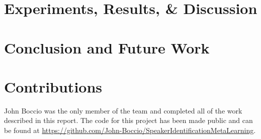 \documentclass{article}
\begin{document}
\section{Experiments, Results, \& Discussion}

\section{Conclusion and Future Work}

\section{Contributions}
John Boccio was the only member of the team and completed all of the work described in this report. The code for this 
project has been made public and can be found at 
\href{https://github.com/John-Boccio/SpeakerIdentificationMetaLearning}{https://github.com/John-Boccio/SpeakerIdentificationMetaLearning}.
\end{document}
